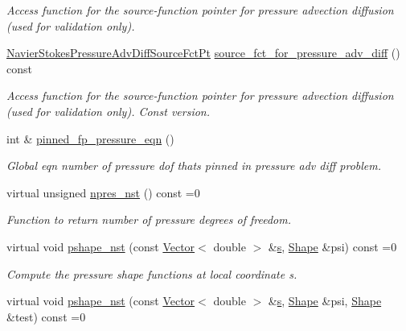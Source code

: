 \begin{DoxyCompactItemize}
\begin{DoxyCompactList}\small\item\em Access function for the source-\/function pointer for pressure advection diffusion (used for validation only). \end{DoxyCompactList}\item 
\hyperlink{classoomph_1_1NavierStokesEquations_ae97e12328a88431038ccb321ee6d0c73}{Navier\+Stokes\+Pressure\+Adv\+Diff\+Source\+Fct\+Pt} \hyperlink{classoomph_1_1NavierStokesEquations_a7e3bace21eae7a6ce139ae9ed842acb1}{source\+\_\+fct\+\_\+for\+\_\+pressure\+\_\+adv\+\_\+diff} () const
\begin{DoxyCompactList}\small\item\em Access function for the source-\/function pointer for pressure advection diffusion (used for validation only). Const version. \end{DoxyCompactList}\item 
int \& \hyperlink{classoomph_1_1NavierStokesEquations_aa013a7e3d96ca1f1db6817298222650e}{pinned\+\_\+fp\+\_\+pressure\+\_\+eqn} ()
\begin{DoxyCompactList}\small\item\em Global eqn number of pressure dof that\textquotesingle{}s pinned in pressure adv diff problem. \end{DoxyCompactList}\item 
virtual unsigned \hyperlink{classoomph_1_1NavierStokesEquations_a4a17a76873bf3131d1e0acc74fb1c2d8}{npres\+\_\+nst} () const =0
\begin{DoxyCompactList}\small\item\em Function to return number of pressure degrees of freedom. \end{DoxyCompactList}\item 
virtual void \hyperlink{classoomph_1_1NavierStokesEquations_a487030303b71da299aed3d4639a022ab}{pshape\+\_\+nst} (const \hyperlink{classoomph_1_1Vector}{Vector}$<$ double $>$ \&\hyperlink{cfortran_8h_ab7123126e4885ef647dd9c6e3807a21c}{s}, \hyperlink{classoomph_1_1Shape}{Shape} \&psi) const =0
\begin{DoxyCompactList}\small\item\em Compute the pressure shape functions at local coordinate s. \end{DoxyCompactList}\item 
virtual void \hyperlink{classoomph_1_1NavierStokesEquations_a55f96a5c9f985476aeb145f683d63001}{pshape\+\_\+nst} (const \hyperlink{classoomph_1_1Vector}{Vector}$<$ double $>$ \&\hyperlink{cfortran_8h_ab7123126e4885ef647dd9c6e3807a21c}{s}, \hyperlink{classoomph_1_1Shape}{Shape} \&psi, \hyperlink{classoomph_1_1Shape}{Shape} \&test) const =0

\end{DoxyCompactItemize}
